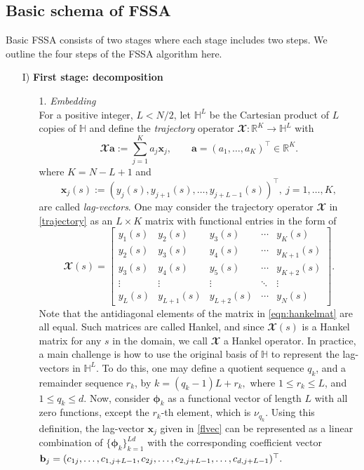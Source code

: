 \subsection{Basic schema of FSSA}
Basic FSSA consists of two stages where each stage includes two steps. We outline the four steps of the FSSA algorithm here.
\begin{itemize}
\item[I)] \textbf{First stage: decomposition}
\begin{itemize}
\item[1.]  \textit{Embedding} \\ For a positive integer, $L<N/2$, let $\mathbb{H}^L$ be the Cartesian product of $L$ copies of $\mathbb{H}$ and define the \textit{trajectory} operator $\mathbfcal{X}:\mathbb{R}^{K} \rightarrow \mathbb{H}^{L}$ with
	\begin{equation}\label{trajectory}
		\mathbfcal{X}{\pmb a}:=\sum_{j=1}^K a_j{\pmb x}_j,\qquad
		{\pmb a}=\left(a_1,\ldots, a_K\right)^\top \in\mathbb{R}^K.
	\end{equation}
	where $K=N-L+1$ and 
	\begin{equation}\label{flvec}
		{\pmb x}_j(s):= \left( y_j(s), y_{j+1}(s), \ldots, y_{j+L-1}(s)\right)^\top,\ j=1,\ldots, K,
	\end{equation}
	are called \textit{lag-vectors}. One may consider the trajectory operator $\mathbfcal{X}$ in \eqref{trajectory} as an $L \times K$ matrix with functional entries in the form of	
	\begin{equation}\label{eqn:hankelmat}
		\mathbfcal{X}(s) = \begin{bmatrix}y_{1}(s) & y_{2}(s) & y_{3}(s) & \cdots & y_{K}(s) \\ y_{2}(s) & y_{3}(s) & y_{4}(s) & \cdots & y_{K+1}(s) \\ y_{3}(s) & y_{4}(s) & y_{5}(s) & \cdots & y_{K+2}(s) \\ \vdots  & \vdots & \vdots & \ddots & \vdots \\ y_{L}(s) & y_{L+1}(s) & y_{L+2}(s) & \cdots & y_{N}(s)  \end{bmatrix}.
	\end{equation}
Note that the antidiagonal elements of the matrix in \eqref{eqn:hankelmat} are all equal. Such matrices are called Hankel, and since $\mathbfcal{X}(s)$ is a Hankel matrix for any $s$ in the domain, we call $\mathbfcal{X}$ a Hankel operator. In practice, a main challenge is how to use the original basis of $\mathbb{H}$ to represent the lag-vectors in $\mathbb{H}^L$. To do this, one may define a quotient sequence $q_k$, and a remainder sequence $r_k$, by $k=(q_k-1)L+r_k,$ where $1\leq r_k\leq L$, and $1\leq q_k\leq d$. Now, consider ${\pmb \phi}_{k}$ as a functional vector of length $L$ with all zero functions, except the $r_k$-th element, which is $\nu_{q_k}$. Using this definition, the lag-vector ${\pmb{x}_j}$ given in \eqref{flvec} can be represented as a linear combination of $\{{\pmb \phi}_{k}\}_{k=1}^{Ld}$ with the corresponding coefficient vector ${\bf b}_j=(c_{1j},\ldots, c_{1,j+L-1},c_{2j},\ldots,c_{2,j+L-1},\ldots,c_{d,j+L-1} )^\top.$ 

\end{itemize}
\end{itemize}
